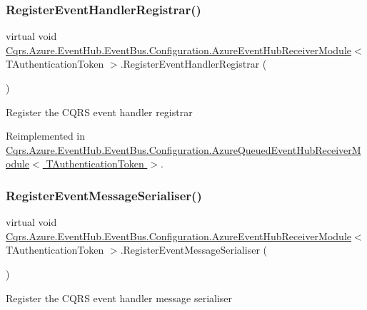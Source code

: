 \subsubsection{\texorpdfstring{Register\+Event\+Handler\+Registrar()}{RegisterEventHandlerRegistrar()}}
{\footnotesize\ttfamily virtual void \hyperlink{classCqrs_1_1Azure_1_1EventHub_1_1EventBus_1_1Configuration_1_1AzureEventHubReceiverModule}{Cqrs.\+Azure.\+Event\+Hub.\+Event\+Bus.\+Configuration.\+Azure\+Event\+Hub\+Receiver\+Module}$<$ T\+Authentication\+Token $>$.Register\+Event\+Handler\+Registrar (\begin{DoxyParamCaption}{ }\end{DoxyParamCaption})\hspace{0.3cm}{\ttfamily [virtual]}}



Register the C\+Q\+RS event handler registrar 



Reimplemented in \hyperlink{classCqrs_1_1Azure_1_1EventHub_1_1EventBus_1_1Configuration_1_1AzureQueuedEventHubReceiverModule_ab0050be0bdfe6b95d068120a6c276986_ab0050be0bdfe6b95d068120a6c276986}{Cqrs.\+Azure.\+Event\+Hub.\+Event\+Bus.\+Configuration.\+Azure\+Queued\+Event\+Hub\+Receiver\+Module$<$ T\+Authentication\+Token $>$}.

\mbox{\label{classCqrs_1_1Azure_1_1EventHub_1_1EventBus_1_1Configuration_1_1AzureEventHubReceiverModule_a7164b8ca5e4e768d46659cff6289156a_a7164b8ca5e4e768d46659cff6289156a}} 
\subsubsection{\texorpdfstring{Register\+Event\+Message\+Serialiser()}{RegisterEventMessageSerialiser()}}
{\footnotesize\ttfamily virtual void \hyperlink{classCqrs_1_1Azure_1_1EventHub_1_1EventBus_1_1Configuration_1_1AzureEventHubReceiverModule}{Cqrs.\+Azure.\+Event\+Hub.\+Event\+Bus.\+Configuration.\+Azure\+Event\+Hub\+Receiver\+Module}$<$ T\+Authentication\+Token $>$.Register\+Event\+Message\+Serialiser (\begin{DoxyParamCaption}{ }\end{DoxyParamCaption})\hspace{0.3cm}{\ttfamily [virtual]}}



Register the C\+Q\+RS event handler message serialiser 

